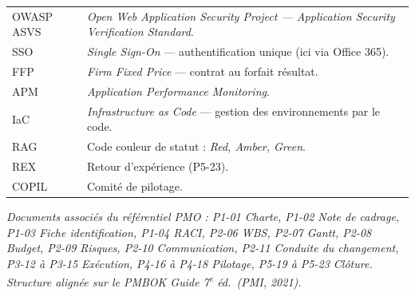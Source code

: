 \documentclass[11pt,a4paper,oneside]{report}
\begin{document}
\begin{tabularx}{\textwidth}{L{3cm} Y}
OWASP ASVS         & \textit{Open Web Application Security Project — Application Security Verification Standard}. \\
SSO                & \textit{Single Sign-On} — authentification unique (ici via Office 365). \\
FFP                & \textit{Firm Fixed Price} — contrat au forfait résultat. \\
APM                & \textit{Application Performance Monitoring}. \\
IaC                & \textit{Infrastructure as Code} — gestion des environnements par le code. \\
RAG                & Code couleur de statut : \textit{Red, Amber, Green}. \\
REX                & Retour d'expérience (P5-23). \\
COPIL              & Comité de pilotage. \\
\bottomrule
\end{tabularx}

\vspace{6pt}
\footnotesize\textit{Documents associés du référentiel PMO : P1-01 Charte, P1-02 Note de
cadrage, P1-03 Fiche identification, P1-04 RACI, P2-06 WBS, P2-07 Gantt, P2-08 Budget,
P2-09 Risques, P2-10 Communication, P2-11 Conduite du changement, P3-12 à P3-15 Exécution,
P4-16 à P4-18 Pilotage, P5-19 à P5-23 Clôture. Structure alignée sur le PMBOK Guide
7\textsuperscript{e} éd.\ (PMI, 2021).}
\end{document}
